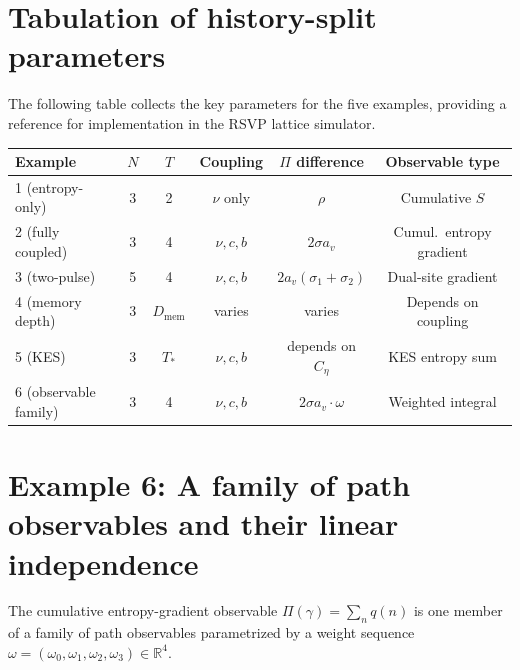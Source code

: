\documentclass[12pt, oneside]{memoir}
\newcommand{\av}{a_v}
\begin{document}
\section{Tabulation of history-split parameters}

The following table collects the key parameters for the five examples, providing a
reference for implementation in the RSVP lattice simulator.

\begin{center}
\begin{tabular}{lccccc}
\toprule
Example & $N$ & $T$ & Coupling & $\Pi$ difference & Observable type \\
\midrule
1 (entropy-only) & 3 & 2 & $\nu$ only & $\rho$ & Cumulative $S$ \\
2 (fully coupled) & 3 & 4 & $\nu,c,b$ & $2\sigma\av$ & Cumul.\ entropy gradient \\
3 (two-pulse) & 5 & 4 & $\nu,c,b$ & $2\av(\sigma_1+\sigma_2)$ & Dual-site gradient \\
4 (memory depth) & 3 & $D_{\mathrm{mem}}$ & varies & varies & Depends on coupling \\
5 (KES) & 3 & $T_*$ & $\nu,c,b$ & depends on $C_\eta$ & KES entropy sum \\
6 (observable family) & 3 & 4 & $\nu,c,b$ & $2\sigma \av \cdot \omega$ & Weighted integral \\
\bottomrule
\end{tabular}
\end{center}

\section{Example 6: A family of path observables and their linear independence}

The cumulative entropy-gradient observable $\Pi(\gamma) = \sum_n q(n)$ is one member of
a family of path observables parametrized by a weight sequence $\omega = (\omega_0,
\omega_1, \omega_2, \omega_3) \in \mathbb{R}^4$.
\end{document}

